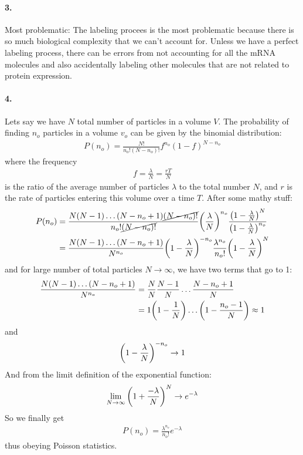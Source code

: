 \documentclass[../main.tex]{subfiles}
\begin{document}
\paragraph*{3.} Most problematic: The labeling procees is the most problematic because there is so 
much biological complexity that we can't account for. Unless we have a perfect labeling process,
there can be errors from not accounting for all the mRNA molecules and also accidentally labeling other
molecules that are not related to protein expression. 

\paragraph*{4.} Lets say we have $N$ total number of particles in a volume $V$. The probability of
finding $n_o$ particles in a volume $v_o$ can be given by the binomial distribution:
\begin{align*}
    P(n_o) = \frac{N!}{n_o!(N-n_o)!}f^{n_o}(1-f)^{N-n_o}
\end{align*}
where the frequency
\begin{align*}
    f = \frac{\lambda}{N} = \frac{rT}{N} 
\end{align*}
is the ratio of the average number of particles $\lambda$ to the total number $N$, and $r$ is the
rate of particles entering this volume over a time $T$. After some mathy stuff:
\begin{align*}
    P(n_o) &= \frac{N(N - 1)\dots(N - n_o + 1) \cancel{(N - n_o)!}}{n_o! \cancel{(N-n_o)!}}
        \qt(\frac{\lambda}{N})^{n_o} \frac{\qt(1-\frac{\lambda}{N})^{N}}{\qt(1-\frac{\lambda}{N})^{n_o}} \\
        &= \frac{N(N - 1)\dots(N - n_o + 1)}{N^{n_o}} \qt(1-\frac{\lambda}{N})^{-n_o}
            \frac{\lambda^{n_o}}{n_o!} \qt(1-\frac{\lambda}{N})^{N} 
\end{align*}
and for large number of total particles $N \to \infty$, we have two terms that go to 1:
\begin{align*}
    \frac{N(N - 1)\dots(N - n_o + 1)}{N^{n_o}} &= \frac{N}{N} \frac{N-1}{N} \dots \frac{N-n_o+1}{N} \\
        &= 1 \qt(1 - \frac{1}{N}) \dots \qt(1 - \frac{n_o-1}{N}) \approx 1
\end{align*}
and
\begin{align*}
    \qt(1 - \frac{\lambda}{N})^{-n_o} \to 1
\end{align*}
And from the limit definition of the exponential function:
\begin{align*}
    \lim_{N \to \infty} \qt(1 + \frac{-\lambda}{N})^{N} \to e^{-\lambda}
\end{align*}
So we finally get
\begin{align*}
    P(n_o) = \frac{\lambda^{n_o}}{n_o!}e^{-\lambda}
\end{align*}
thus obeying Poisson statistics.
\end{document}

